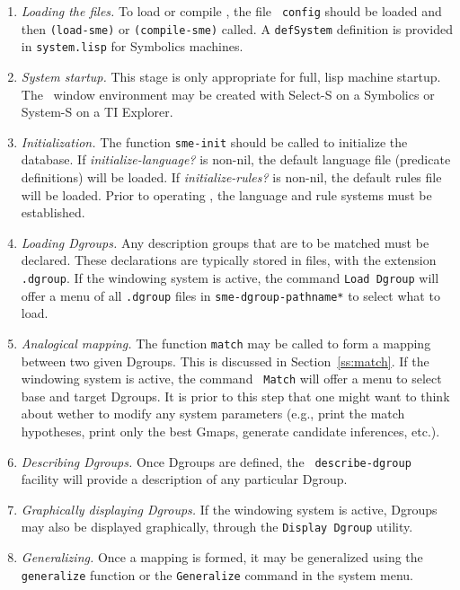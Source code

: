 \begin{enumerate}

\item {\it Loading the files.} To load or compile \SME, the file {\tt
config} should be loaded and then {\tt (load-sme)} or {\tt (compile-sme)}
called. A {\tt defSystem} definition is provided in {\tt system.lisp} for
Symbolics machines.

\item {\it System startup.} This stage is only appropriate for full, lisp
machine startup. The \SME\ window environment may be created with Select-S
on a Symbolics or System-S on a TI Explorer.

\item {\it Initialization.} The function {\tt sme-init} should be called to
initialize the database. If {\it initialize-language?} is non-nil, the
default language file (predicate definitions) will be loaded. If {\it
initialize-rules?} is non-nil, the default rules file will be loaded. Prior
to operating \SME, the language and rule systems must be established.

\item {\it Loading Dgroups.} Any description groups that are to be matched
must be declared. These declarations are typically stored in files, with the
extension {\tt *.dgroup}. If the windowing system is active, the command
{\tt Load Dgroup} will offer a menu of all {\tt *.dgroup} files in
{\tt *sme-dgroup-pathname*} to select what to load.

\item {\it Analogical mapping.} The function {\tt match} may be called to
form a mapping between two given Dgroups. This is discussed in
Section~\ref{ss:match}. If the windowing system is active, the command {\tt
Match} will offer a menu to select base and target Dgroups. It is prior to
this step that one might want to think about wether to modify any system
parameters (e.g., print the match hypotheses, print only the best Gmaps,
generate candidate inferences, etc.). 

\item {\it Describing Dgroups.} Once Dgroups are defined, the {\tt
describe-dgroup} facility will provide a description of any particular
Dgroup.

\item {\it Graphically displaying Dgroups.} If the windowing system is
active, Dgroups may also be displayed graphically, through the {\tt Display
Dgroup} utility.

\item {\it Generalizing.} Once a mapping is formed, it may be generalized
using the {\tt generalize} function or the {\tt Generalize} command in the
system menu.


\end{enumerate}
